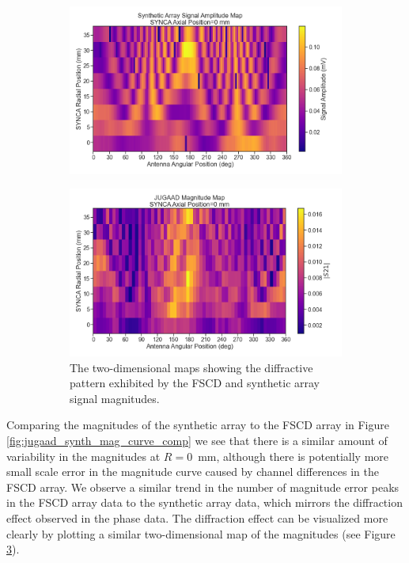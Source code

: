 \begin{figure}[htbp]
\centering
\begin{subfigure}{.7\textwidth}
  \centering
  \includegraphics[width=1\textwidth]{figs/Chapter-5/230120_synth_array_signal_amplitude_map_z0.png}
  \caption{}
  \label{fig:synth-jugaad-mag-map}
\end{subfigure}
\par\medskip %
\begin{subfigure}{.7\textwidth}
  \centering
  \includegraphics[width=1\textwidth]{figs/Chapter-5/230123_jugaad_magnitude_map_z0.png}
  \caption{The two-dimensional maps showing the diffractive pattern exhibited by the FSCD and synthetic array signal magnitudes.}
  \label{fig:jugaad-mag-map}
\end{subfigure}
\caption{}
\label{fig:measured-mag-map-comp-jugaad}
\end{figure}

Comparing the magnitudes of the synthetic array to the FSCD array in Figure \ref{fig:jugaad_synth_mag_curve_comp} we see that there is a similar amount of variability in the magnitudes at $R=0$~mm, although there is potentially more small scale error in the magnitude curve caused by channel differences in the FSCD array. We observe a similar trend in the number of magnitude error peaks in the FSCD array data to the synthetic array data, which mirrors the diffraction effect observed in the phase data. The diffraction effect can be visualized more clearly by plotting a similar two-dimensional map of the magnitudes (see Figure \ref{fig:measured-mag-map-comp-jugaad}).

